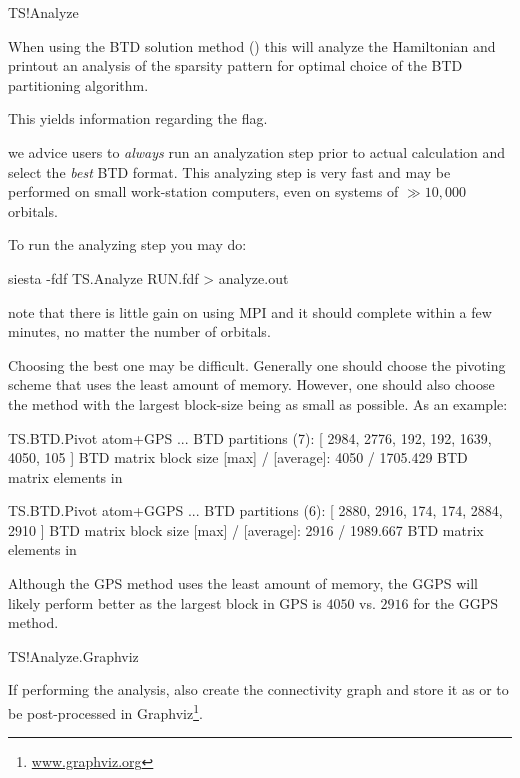\begin{fdflogicalF}{TS!Analyze}

  When using the BTD solution method () this
  will analyze the Hamiltonian and printout an analysis of the
  sparsity pattern for optimal choice of the BTD partitioning
  algorithm.

  This yields information regarding the  flag.

  \note we advice users to \emph{always} run an analyzation step prior
  to actual calculation and select the \emph{best} BTD format. This
  analyzing step is very fast and may be performed on small
  work-station computers, even on systems of $\gg10,000$ orbitals.

  To run the analyzing step you may do:
  \begin{shellexample}
    siesta -fdf TS.Analyze RUN.fdf > analyze.out
  \end{shellexample}
  note that there is little gain on using MPI and it should complete
  within a few minutes, no matter the number of orbitals.

  Choosing the best one may be difficult. Generally one should choose
  the pivoting scheme that uses the least amount of memory. However,
  one should also choose the method with the largest block-size being
  as small as possible. As an example:
  \begin{shellexample}
TS.BTD.Pivot atom+GPS
...
    BTD partitions (7): 
     [ 2984, 2776, 192, 192, 1639, 4050, 105 ]
    BTD matrix block size [max] / [average]: 4050 /   1705.429
    BTD matrix elements in %

TS.BTD.Pivot atom+GGPS
...
    BTD partitions (6): 
     [ 2880, 2916, 174, 174, 2884, 2910 ]
    BTD matrix block size [max] / [average]: 2916 /   1989.667
    BTD matrix elements in %

  \end{shellexample}
  Although the GPS method uses the least amount of memory, the GGPS
  will likely perform better as the largest block in GPS is $4050$
  vs. $2916$ for the GGPS method. 

\end{fdflogicalF}

\begin{fdflogicalF}{TS!Analyze.Graphviz}

  If performing the analysis, also create the connectivity graph and
  store it as  or 
  to be post-processed in Graphviz\footnote{\url{www.graphviz.org}}.
  
\end{fdflogicalF}


